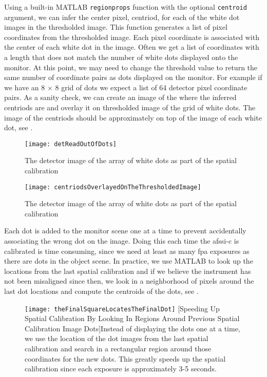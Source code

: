Using a built-in MATLAB \texttt{regionprops} function with the optional \texttt{centroid} argument, we can infer the center pixel, centriod, for each of the white dot images in the thresholded image. This function generates a list of pixel coordinates from the thresholded image. Each pixel coordinate is associated with the center of each white dot in the image. Often we get a list of coordinates with a length that does not match the number of white dots displayed onto the monitor. At this point, we may need to change the threshold value to return the same number of coordinate pairs as dots displayed on the monitor. For example if we have an 8 $\times$ 8 grid of dots we expect a list of 64 detector pixel coordinate pairs. As a sanity check, we can create an image of the where the inferred centriods are and overlay it on thresholded image of the grid of white dots. The image of the centriods should be approximately on top of the image of each white dot, see .

\begin{figure}[h]
\texttt{[image: detReadOutOfDots]}
\centering
\caption{The detector image of the array of white dots as part of the spatial calibration}
\label{fig:detReadOutOfDots}
\end{figure}

\begin{figure}[h]
\texttt{[image: centriodsOverlayedOnTheThresholdedImage]}
\centering
\caption{The detector image of the array of white dots as part of the spatial calibration}
\label{fig:centriodsOverlayedOnTheThresholdedImage}
\end{figure}

Each dot is added to the monitor scene one at a time to prevent accidentally associating the wrong dot on the image. Doing this each time the \gls{afssi-c} is calibrated is time consuming, since we need at least as many \gls{fpa} exposures as there are dots in the object scene. In practice, we use MATLAB to look up the locations from the last spatial calibration and if we believe the instrument has not been misaligned since then, we look in a neighborhood of pixels around the last dot locations and compute the centroids of the dots, see .


\begin{figure}[h]
\texttt{[image: theFinalSquareLocatesTheFinalDot]}
\centering
{}[Speeding Up Spatial Calibration By Looking In Regions Around Previous Spatial Calibration Image Dots]{Instead of displaying the dots one at a time, we use the location of the dot images from the last spatial calibration and search in a rectangular region around those coordinates for the new dots. This greatly speeds up the spatial calibration since each exposure is approximately 3-5 seconds.}
\label{fig:theFinalSquareLocatesTheFinalDot}
\end{figure}


